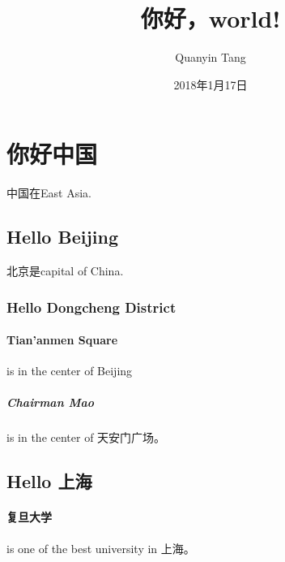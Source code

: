 \documentclass[UTF8]{ctexart}
\title{你好，world!}
\author{Quanyin Tang}
\date{2018年1月17日}
\begin{document}
\maketitle
\section{你好中国}
中国在East Asia.
\subsection{Hello Beijing}
北京是capital of China.
\subsubsection{Hello Dongcheng District}
\paragraph{Tian'anmen Square}
is in the center of Beijing
\subparagraph{Chairman Mao}
is in the center of 天安门广场。
\subsection{Hello 上海}
\paragraph{复旦大学} is one of the best university in 上海。
\end{document}
